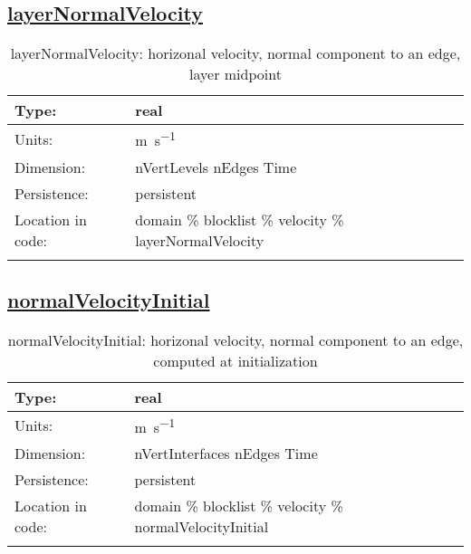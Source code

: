 \subsection[layerNormalVelocity]{\hyperref[sec:var_tab_velocity]{layerNormalVelocity}}
\label{subsec:var_sec_velocity_layerNormalVelocity}
\begin{center}
\begin{longtable}{| p{2.0in} | p{4.0in} |}
        \hline 
        Type: & real \\
        \hline 
        Units: & \si{m.s^{-1}} \\
        \hline 
        Dimension: & nVertLevels nEdges Time \\
        \hline 
        Persistence: & persistent \\
        \hline 
         Location in code: & domain \% blocklist \% velocity \% layerNormalVelocity \\
         \hline 
    \caption{layerNormalVelocity: horizonal velocity, normal component to an edge, layer midpoint}
\end{longtable}
\end{center}
\subsection[normalVelocityInitial]{\hyperref[sec:var_tab_velocity]{normalVelocityInitial}}
\label{subsec:var_sec_velocity_normalVelocityInitial}
\begin{center}
\begin{longtable}{| p{2.0in} | p{4.0in} |}
        \hline 
        Type: & real \\
        \hline 
        Units: & \si{m.s^{-1}} \\
        \hline 
        Dimension: & nVertInterfaces nEdges Time \\
        \hline 
        Persistence: & persistent \\
        \hline 
         Location in code: & domain \% blocklist \% velocity \% normalVelocityInitial \\
         \hline 
    \caption{normalVelocityInitial: horizonal velocity, normal component to an edge, computed at initialization}
\end{longtable}
\end{center}
